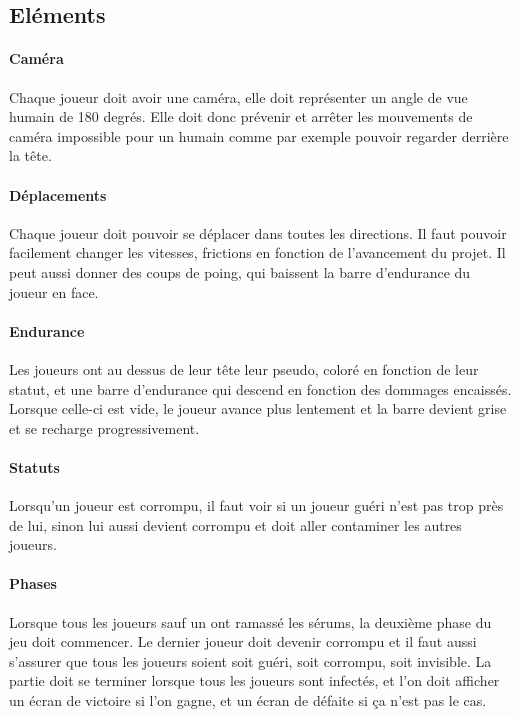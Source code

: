 \documentclass{article}
\begin{document}
\subsection{Eléments}
\paragraph{Caméra}
Chaque joueur doit avoir une caméra, elle doit représenter un angle de vue humain de 180 degrés. Elle doit donc prévenir et arrêter les mouvements de caméra impossible pour un humain comme par exemple pouvoir regarder derrière la tête.

\paragraph{Déplacements}
Chaque joueur doit pouvoir se déplacer dans toutes les directions. Il faut pouvoir facilement changer les vitesses, frictions en fonction de l'avancement du projet. Il peut aussi donner des coups de poing, qui baissent la barre d'endurance du joueur en face.

\paragraph{Endurance}
Les joueurs ont au dessus de leur tête leur pseudo, coloré en fonction de leur statut, et une barre d'endurance qui descend en fonction des dommages encaissés. Lorsque celle-ci est vide, le joueur avance plus lentement et la barre devient grise et se recharge progressivement. 

\paragraph{Statuts}
Lorsqu'un joueur est corrompu, il faut voir si un joueur guéri n'est pas trop près de lui, sinon lui aussi devient corrompu et doit aller contaminer les autres joueurs.

\paragraph{Phases}
Lorsque tous les joueurs sauf un ont ramassé les sérums, la deuxième phase du jeu doit commencer. Le dernier joueur doit devenir corrompu et il faut aussi s'assurer que tous les joueurs soient soit guéri, soit corrompu, soit invisible. La partie doit se terminer lorsque tous les joueurs sont infectés, et l'on doit afficher un écran de victoire si l'on gagne, et un écran de défaite si ça n'est pas le cas.
\end{document}

